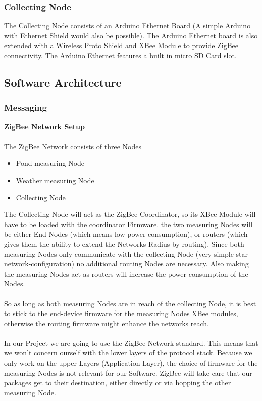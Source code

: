 \documentclass[
	11pt,
	a4paper
]{article}%
\begin{document}
\subsubsection{Collecting Node}
The Collecting Node consists of an Arduino Ethernet Board (A simple Arduino with Ethernet Shield would also be possible). The Arduino Ethernet board is also extended with a Wireless Proto Shield and XBee Module to provide ZigBee connectivity. The Arduino Ethernet features a built in micro SD Card slot.

\subsection{Software Architecture}
\subsubsection{Messaging}
\textbf{ZigBee Network Setup}
\\\\
The ZigBee Network consists of three Nodes
\begin{itemize}
\item Pond measuring Node
\item Weather measuring Node
\item Collecting Node
\end{itemize}
The Collecting Node will act as the ZigBee Coordinator, so its XBee Module will have to be loaded with the coordinator Firmware. the two measuring Nodes will be either End-Nodes (which means low power consumption), or routers (which gives them the ability to extend the Networks Radius by routing). Since both measuring Nodes only communicate with the collecting Node (very simple star-network-configuration) no additional routing Nodes are necessary. Also making the measuring Nodes act as routers will increase the power consumption of the Nodes.
\\\\
So as long as both measuring Nodes are in reach of the collecting Node, it is best to stick to the end-device firmware for the measuring Nodes XBee modules, otherwise the routing firmware might enhance the networks reach.
\\\\
In our Project we are going to use the ZigBee Network standard. This means that we won't concern ourself with the lower layers of the protocol stack. Because we only work on the upper Layers (Application Layer), the choice of firmware for the measuring Nodes is not relevant for our Software. ZigBee will take care that our packages get to their destination, either directly or via hopping the other measuring Node.
\end{document}
